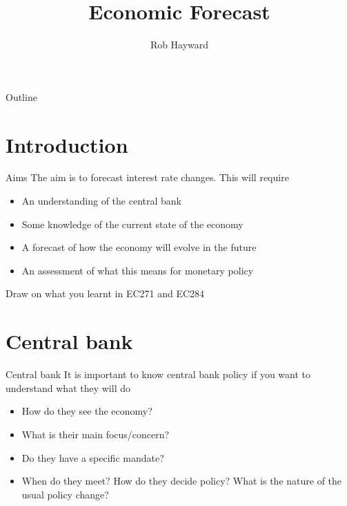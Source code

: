 \documentclass[14pt,xcolor=pdftex,dvipsnames,table]{beamer}\usepackage[]{graphicx}\usepackage[]{color}
\title{Economic Forecast}
\author{Rob Hayward}
\begin{document}
\begin{frame}
\titlepage
\end{frame}


\begin{frame}{Outline}
\tableofcontents
\end{frame}

\section{Introduction}
\begin{frame}{Aims}
The aim is to forecast interest rate changes. This will require
\pause
\begin{itemize}[<+-| alert@+>]
\item An understanding of the central bank
\item Some knowledge of the current state of the economy
\item A forecast of how the economy will evolve in the future
\item An assessment of what this means for monetary policy
\end{itemize}
\pause
Draw on what you learnt in EC271 and EC284
\end{frame}


\section{Central bank}
\begin{frame}{Central bank}
It is important to know central bank policy if you want to understand what they will do
\pause
\begin{itemize}[<+-| alert@+>]
\item How do they see the economy?
\item What is their main focus/concern?
\item Do they have a specific mandate? 
\item When do they meet?  How do they decide policy?  What is the nature of the usual policy change? 
\end{itemize}
\end{frame}
\end{document}
